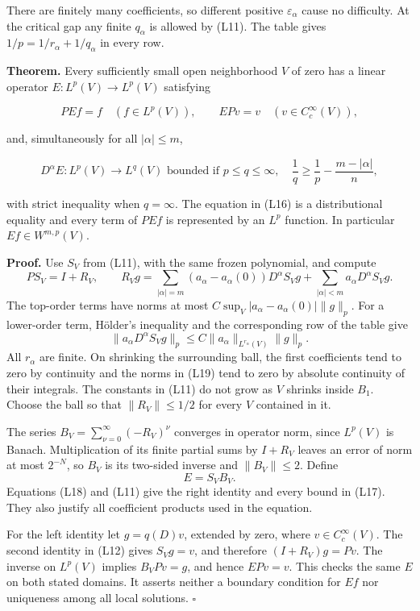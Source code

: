 \documentclass[
  11pt,
]{article}
\begin{document}
There are finitely many coefficients, so different positive
\(\varepsilon_\alpha\) cause no difficulty. At the critical gap any
finite \(q_\alpha\) is allowed by (L11). The table gives
\(1/p=1/r_\alpha+1/q_\alpha\) in every row.

\textbf{Theorem.} Every sufficiently small open neighborhood \(V\) of
zero has a linear operator \(E:L^p(V)\to L^p(V)\) satisfying

\[
PEf=f\quad(f\in L^p(V)),\qquad EPv=v\quad(v\in C_c^\infty(V)),     \tag{L16}
\]

and, simultaneously for all \(|\alpha|\leq m\),

\[
D^\alpha E:L^p(V)\longrightarrow L^q(V)\text{ bounded if }
p\leq q\leq\infty,\quad
\frac1q\geq\frac1p-\frac{m-|\alpha|}{n},                           \tag{L17}
\]

with strict inequality when \(q=\infty\). The equation in (L16) is a
distributional equality and every term of \(PEf\) is represented by an
\(L^p\) function. In particular \(Ef\in W^{m,p}(V)\).

\textbf{Proof.} Use \(S_V\) from (L11), with the same frozen polynomial,
and compute \[
PS_V=I+R_V,\qquad
R_Vg=\sum_{|\alpha|=m}(a_\alpha-a_\alpha(0))D^\alpha S_Vg
       +\sum_{|\alpha|<m}a_\alpha D^\alpha S_Vg.                   \tag{L18}
\] The top-order terms have norms at most
\(C\sup_V|a_\alpha-a_\alpha(0)|\|g\|_p\). For a lower-order term,
Hölder's inequality and the corresponding row of the table give \[
\|a_\alpha D^\alpha S_Vg\|_p
\leq C\|a_\alpha\|_{L^{r_\alpha}(V)}\|g\|_p.                      \tag{L19}
\] All \(r_\alpha\) are finite. On shrinking the surrounding ball, the
first coefficients tend to zero by continuity and the norms in (L19)
tend to zero by absolute continuity of their integrals. The constants in
(L11) do not grow as \(V\) shrinks inside \(B_1\). Choose the ball so
that \(\|R_V\|\leq1/2\) for every \(V\) contained in it.

The series \(B_V=\sum_{\nu=0}^\infty(-R_V)^\nu\) converges in operator
norm, since \(L^p(V)\) is Banach. Multiplication of its finite partial
sums by \(I+R_V\) leaves an error of norm at most \(2^{-N}\), so \(B_V\)
is its two-sided inverse and \(\|B_V\|\leq2\). Define \[
E=S_VB_V.                                                        \tag{L20}
\] Equations (L18) and (L11) give the right identity and every bound in
(L17). They also justify all coefficient products used in the equation.

For the left identity let \(g=q(D)v\), extended by zero, where
\(v\in C_c^\infty(V)\). The second identity in (L12) gives \(S_Vg=v\),
and therefore \((I+R_V)g=Pv\). The inverse on \(L^p(V)\) implies
\(B_VPv=g\), and hence \(EPv=v\). This checks the same \(E\) on both
stated domains. It asserts neither a boundary condition for \(Ef\) nor
uniqueness among all local solutions. \(\square\)
\end{document}
